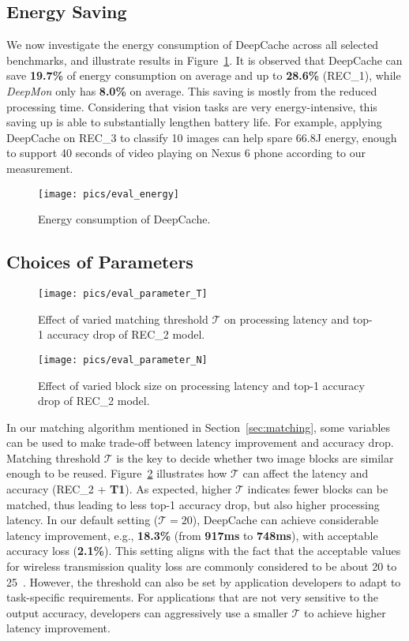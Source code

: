 \documentclass[10pt,acmtog]{acmart}
\newcommand{\framework}{DeepCache\xspace}
\begin{document}
\subsection{Energy Saving}

We now investigate the energy consumption of \framework across all selected benchmarks, and illustrate results in Figure~\ref{fig:eval_energy}.
It is observed that \framework can save \textbf{19.7\%} of energy consumption on average and up to \textbf{28.6\%} (REC\_1), while \emph{DeepMon} only has \textbf{8.0\%} on average.
This saving is mostly from the reduced processing time.
Considering that vision tasks are very energy-intensive, this saving up is able to substantially lengthen battery life.
For example, applying \framework on REC\_3 to classify 10 images can help spare 66.8J energy, enough to support 40 seconds of video playing on Nexus 6 phone according to our measurement.

\begin{figure}[t]
	\centering
	\texttt{[image: pics/eval\_energy]}
	\caption{Energy consumption of \framework.}
	\label{fig:eval_energy}
\end{figure}\subsection{Choices of Parameters}\label{sec:eval_choosing}\begin{figure}[t]
\centering
\scriptsize
\texttt{[image: pics/eval\_parameter\_T]}
\caption{Effect of varied matching threshold $\mathcal{T}$ on processing latency and top-1 accuracy drop of REC\_2 model.}
\label{fig:eval_parameter_T}
\end{figure}\begin{figure}[t]
\centering
\scriptsize
\texttt{[image: pics/eval\_parameter\_N]}
\caption{Effect of varied block size on processing latency and top-1 accuracy drop of REC\_2 model.}
\label{fig:eval_parameter_N}
\end{figure}

In our matching algorithm mentioned in Section~\ref{sec:matching}, some variables can be used to make trade-off between latency improvement and accuracy drop.
Matching threshold $\mathcal{T}$ is the key to decide whether two image blocks are similar enough to be reused.
Figure~\ref{fig:eval_parameter_T} illustrates how $\mathcal{T}$ can affect the latency and accuracy (REC\_2 + \textbf{T1}).
As expected, higher $\mathcal{T}$ indicates fewer blocks can be matched, thus leading to less top-1 accuracy drop, but also higher processing latency.
In our default setting ($\mathcal{T} = 20$), \framework can achieve considerable latency improvement, e.g., \textbf{18.3\%} (from \textbf{917ms} to \textbf{748ms}), with acceptable accuracy loss (\textbf{2.1\%}).
This setting aligns with the fact that the acceptable values for wireless transmission quality loss are commonly considered to be about 20 to 25~\cite{psnr}.
However, the threshold can also be set by application developers to adapt to task-specific requirements.
For applications that are not very sensitive to the output accuracy, developers can aggressively use a smaller $\mathcal{T}$ to achieve higher latency improvement.
\end{document}
